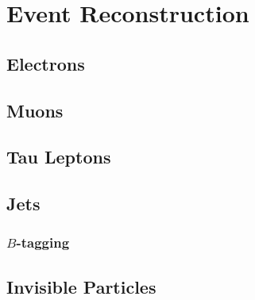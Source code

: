 \chapter{Event Reconstruction}

\section{Electrons}

\section{Muons}

\section{Tau Leptons}

\section{Jets}

\subsection{$B$-tagging}

\section{Invisible Particles}
